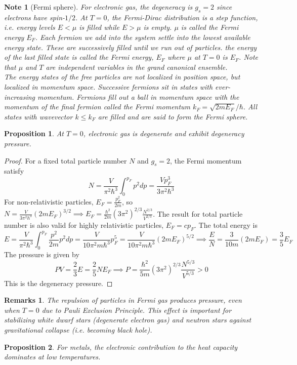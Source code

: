 \documentclass[a4paper]{article}
\newtheorem{remarks}{Remarks}[section]
\newtheorem{Note}{Note}[section]
\theoremstyle{new}
\newtheorem{prop}{Proposition}[section]
\begin{document}
\begin{Note}[Fermi sphere]
For electronic gas, the degeneracy is $g_s=2$ since electrons have spin-$1/2$. At $T=0$, the Fermi-Dirac distribution is a step function, i.e. energy levels $E<\mu$ is filled while $E>\mu$ is empty. $\mu$ is called the Fermi energy $E_F$. Each fermion we add into the system settle into the lowest available energy state. These are successively filled until we run out of particles. the energy of the last filled state is called the Fermi energy, $E_F$ where $\mu$ at $T=0$ is $E_F$. Note that $\mu$ and $T$ are independent variables in the grand canonical ensemble.\\[5pt]
The energy states of the free particles are not localized in position space, but localized in momentum space. Successive fermions sit in states with ever-increasing momentum. Fermions fill out a ball in momentum space with the momentum of the final fermion called the Fermi momentum $k_F=\sqrt{2mE_F}/\hbar$. All states with wavevector $k\leq k_F$ are filled and are said to form the Fermi sphere.
\end{Note}
\begin{prop}
At $T=0$, electronic gas is degenerate and exhibit degeneracy pressure.
\end{prop}
\begin{proof}
For a fixed total particle number $N$ and $g_s=2$, the Fermi momentum satisfy
$$N=\frac{V}{\pi^2\hbar^3}\int_0^{p_F}p^2dp=\frac{Vp_F^3}{3\pi^2\hbar^3}$$
For non-relativistic particles, $E_F=\frac{p_F^2}{2m}$, so $N=\frac{V}{3\pi^2 h^3}(2mE_F)^{3/2}\implies E_F=\frac{\hbar^2}{2m}(3\pi^2)^{2/3}\frac{N^{2/3}}{V^{2/3}}$. The result for total particle number is also valid for highly relativistic particles, $E_F=cp_F$. The total energy is
$$E=\frac{V}{\pi^2\hbar^3}\int_0^{p_F}\frac{p^2}{2m}p^2dp=\frac{V}{10\pi^2m\hbar^3}p_F^5=\frac{V}{10\pi^2m\hbar^3}(2mE_F)^{5/2}\implies\frac{E}{N}=\frac{3}{10m}(2mE_F)=\frac{3}{5}E_F$$
The pressure is given by $$PV=\frac{2}{3}E=\frac{2}{5}NE_F\implies P=\frac{\hbar^2}{5m}(3\pi^2)^{2/3}\frac{N^{5/3}}{V^{5/3}}>0$$ 
This is the degeneracy pressure.
\end{proof}
\begin{remarks}
The repulsion of particles in Fermi gas produces pressure, even when $T=0$ due to Pauli Exclusion Principle. This effect is important for stabilizing white dwarf stars (degenerate electron gas) and neutron stars against gravitational collapse (i.e. becoming black hole).
\end{remarks}
\begin{prop}
For metals, the electronic contribution to the heat capacity dominates at low temperatures.
\end{prop}
\end{document}
